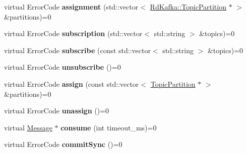 \begin{DoxyCompactItemize}
\item 
\hypertarget{classRdKafka_1_1KafkaConsumer_afd22626a2b370f378272e30411df6f78}{virtual Error\-Code {\bfseries assignment} (std\-::vector$<$ \hyperlink{classRdKafka_1_1TopicPartition}{Rd\-Kafka\-::\-Topic\-Partition} $\ast$ $>$ \&partitions)=0}\label{classRdKafka_1_1KafkaConsumer_afd22626a2b370f378272e30411df6f78}

\item 
\hypertarget{classRdKafka_1_1KafkaConsumer_a470f95d195c1c0dc9466040cdf1ec12d}{virtual Error\-Code {\bfseries subscription} (std\-::vector$<$ std\-::string $>$ \&topics)=0}\label{classRdKafka_1_1KafkaConsumer_a470f95d195c1c0dc9466040cdf1ec12d}

\item 
\hypertarget{classRdKafka_1_1KafkaConsumer_a7404297cecc9be656026c6c6154ce2bd}{virtual Error\-Code {\bfseries subscribe} (const std\-::vector$<$ std\-::string $>$ \&topics)=0}\label{classRdKafka_1_1KafkaConsumer_a7404297cecc9be656026c6c6154ce2bd}

\item 
\hypertarget{classRdKafka_1_1KafkaConsumer_a933d7e1d8bceab2422463ee8b335f15b}{virtual Error\-Code {\bfseries unsubscribe} ()=0}\label{classRdKafka_1_1KafkaConsumer_a933d7e1d8bceab2422463ee8b335f15b}

\item 
\hypertarget{classRdKafka_1_1KafkaConsumer_af3f872bcb7d46febbaea63518f854b46}{virtual Error\-Code {\bfseries assign} (const std\-::vector$<$ \hyperlink{classRdKafka_1_1TopicPartition}{Topic\-Partition} $\ast$ $>$ \&partitions)=0}\label{classRdKafka_1_1KafkaConsumer_af3f872bcb7d46febbaea63518f854b46}

\item 
\hypertarget{classRdKafka_1_1KafkaConsumer_a21dc83bc3eb00e2b4e0f6373244976b6}{virtual Error\-Code {\bfseries unassign} ()=0}\label{classRdKafka_1_1KafkaConsumer_a21dc83bc3eb00e2b4e0f6373244976b6}

\item 
\hypertarget{classRdKafka_1_1KafkaConsumer_a7dc106f1c3b99767a0930a9cf8cabf84}{virtual \hyperlink{classRdKafka_1_1Message}{Message} $\ast$ {\bfseries consume} (int timeout\-\_\-ms)=0}\label{classRdKafka_1_1KafkaConsumer_a7dc106f1c3b99767a0930a9cf8cabf84}

\item 
\hypertarget{classRdKafka_1_1KafkaConsumer_a1c421bf2b44509704ad3d9e785c5b15c}{virtual Error\-Code {\bfseries commit\-Sync} ()=0}\label{classRdKafka_1_1KafkaConsumer_a1c421bf2b44509704ad3d9e785c5b15c}


\end{DoxyCompactItemize}
